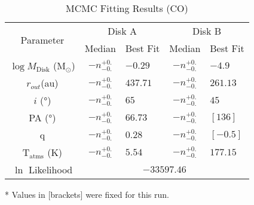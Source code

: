 \begin{table}
  \begin{threeparttable}
    \centering
    \caption{MCMC Fitting Results (CO)}
    \label{table:fit_co}
    \renewcommand{\arraystretch}{1.2}
    \begin{tabular}{c c l c l }
      \toprule \toprule
      \multirow{2}{*}{Parameter} & \multicolumn{2}{c}{Disk A} & \multicolumn{2}{c}{Disk B} \\
                                 & Median & Best Fit          & Median & Best Fit \\
      \midrule %
      $\log M_\text{Disk}$ (M$_\odot$) & $ -n _{-0.} ^{+0.}$ & $-0.29$    & $ -n _{-0.} ^{+0.}$ & $-4.9$ \\
      $r_{out}$(\si{au})               & $ -n _{-0.} ^{+0.}$ & $437.71$    & $ -n _{-0.} ^{+0.}$  & $261.13$    \\
      $i$ (\si{\degree})               & $ -n _{-0.} ^{+0.}$ & $65$    & $ -n _{-0.} ^{+0.}$ & $45$    \\
      PA  (\si{\degree})               & $ -n _{-0.} ^{+0.}$ & $66.73$  & $ -n _{-0.} ^{+0.}$  & $[136]$  \\
      q                                & $ -n _{-0.} ^{+0.}$ & $0.28$  & $ -n _{-0.} ^{+0.}$  & $[-0.5]$  \\
      T$_\text{atms}$ (K)              & $ -n _{-0.} ^{+0.}$ & $5.54 $  & $ -n _{-0.} ^{+0.}$  & $177.15$  \\
      $\ln$ Likelihood          & \multicolumn{4}{c}{$-33597.46$} \\
      \bottomrule
    \end{tabular}

    \begin{tablenotes}\footnotesize
      \item[*] Values in [brackets] were fixed for this run.
    \end{tablenotes}
  \end{threeparttable}
\end{table}












